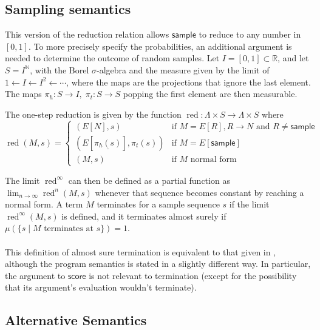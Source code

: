 \documentclass{article}
\newcommand{\tsample}{\textsf{sample}}
\newcommand{\tscore}{\textsf{score}}
\DeclareMathOperator{\red}{red}
\begin{document}
\subsection{Sampling semantics}
This version of the reduction relation allows $\tsample$ to reduce to any number in $[0,1]$. To more precisely specify the probabilities, an additional argument is needed to determine the outcome of random samples. Let $ I = [0,1] \subset \mathbb{R} $, and let $S = I^{\mathbb{N}}$, with the Borel $\sigma$-algebra and the measure given by the limit of $1 \gets I \gets I^2 \gets \cdots$, where the maps are the projections that ignore the last element. 
The maps $\pi_h:S \to I, \; \pi_t:S \to S$ popping the first element are then measurable.

The one-step reduction is given by the function $\red : \Lambda \times S \to \Lambda \times S$ where
\begin{equation}
\red(M,s) = \left\{
    \begin{array}{ll}
        (E[N],s) & \text{if } M = E[R], R \to N \text{ and } R \neq \tsample \\
        (E[\underline{\pi_h(s)}],\pi_t(s)) & \text{if } M = E[\tsample] \\
        (M,s) & \text{if } M \text{ normal form}
    \end{array} \right .
\end{equation}

The limit $\red^\infty$ can then be defined as a partial function as $\lim_{n \to \infty} \red^n(M,s)$ whenever that sequence becomes constant by reaching a normal form. A term $M$ terminates for a sample sequence $s$ if the limit $\red^\infty(M,s)$ is defined, and it terminates almost surely if $\mu(\{s \mid M \text{ terminates at } s\}) = 1$.

\paragraph{}
This definition of almost sure termination is equivalent to that given in \citep{MakOP20b}, although the program semantics is stated in a slightly different way. In particular, the argument to $\tscore$ is not relevant to termination (except for the possibility that its argument's evaluation wouldn't terminate).

\subsection{Alternative Semantics}
\end{document}
